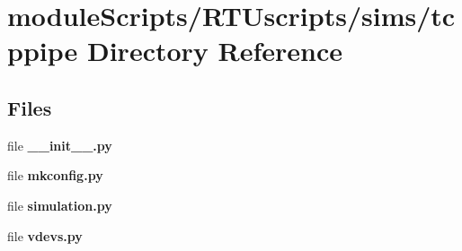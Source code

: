 \section{module\+Scripts/\+R\+T\+Uscripts/sims/tcppipe Directory Reference}
\label{dir_2b9f40643af8b7e861a6ccf6325170f5}
\subsection*{Files}
\begin{DoxyCompactItemize}
\item 
file {\bf \+\_\+\+\_\+init\+\_\+\+\_\+.\+py}
\item 
file {\bf mkconfig.\+py}
\item 
file {\bf simulation.\+py}
\item 
file {\bf vdevs.\+py}
\end{DoxyCompactItemize}
